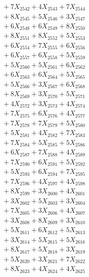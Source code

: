\documentclass[a4paper,10pt]{article}
\begin{document}
{\begin{align}
&\;  + 7 X_{2542} + 4 X_{2543} + 7 X_{2544} \\[0.3ex]
&\;  + 8 X_{2545} + 5 X_{2546} + 3 X_{2547} \\[0.3ex]
&\;  + 6 X_{2548} + 6 X_{2549} + 8 X_{2550} \\[0.3ex]
&\;  + 8 X_{2551} + 8 X_{2552} + 5 X_{2553} \\[0.3ex]
&\;  + 6 X_{2554} + 7 X_{2555} + 6 X_{2556} \\[0.3ex]
&\;  + 6 X_{2557} + 6 X_{2558} + 5 X_{2559} \\[0.5ex]\allowbreak
&\;  + 5 X_{2560} + 5 X_{2561} + 6 X_{2562} \\[0.3ex]
&\;  + 6 X_{2563} + 6 X_{2564} + 5 X_{2565} \\[0.3ex]
&\;  + 5 X_{2566} + 3 X_{2567} + 6 X_{2568} \\[0.3ex]
&\;  + 8 X_{2569} + 3 X_{2570} + 5 X_{2571} \\[0.3ex]
&\;  + 4 X_{2572} + 3 X_{2573} + 4 X_{2574} \\[0.3ex]
&\;  + 7 X_{2575} + 6 X_{2576} + 4 X_{2577} \\[0.3ex]
&\;  + 7 X_{2578} + 7 X_{2579} + 5 X_{2580} \\[0.3ex]
&\;  + 5 X_{2581} + 4 X_{2582} + 7 X_{2583} \\[0.3ex]
&\;  + 7 X_{2584} + 5 X_{2585} + 5 X_{2586} \\[0.3ex]
&\;  + 6 X_{2587} + 7 X_{2588} + 4 X_{2589} \\[0.5ex]\allowbreak
&\;  + 7 X_{2590} + 6 X_{2591} + 5 X_{2592} \\[0.3ex]
&\;  + 5 X_{2593} + 6 X_{2594} + 7 X_{2595} \\[0.3ex]
&\;  + 7 X_{2596} + 4 X_{2597} + 4 X_{2598} \\[0.3ex]
&\;  + 8 X_{2599} + 3 X_{2600} + 4 X_{2601} \\[0.3ex]
&\;  + 3 X_{2602} + 5 X_{2603} + 3 X_{2604} \\[0.3ex]
&\;  + 7 X_{2605} + 3 X_{2606} + 4 X_{2607} \\[0.3ex]
&\;  + 3 X_{2608} + 8 X_{2609} + 3 X_{2610} \\[0.3ex]
&\;  + 5 X_{2611} + 6 X_{2612} + 5 X_{2613} \\[0.3ex]
&\;  + 3 X_{2614} + 5 X_{2615} + 5 X_{2616} \\[0.3ex]
&\;  + 8 X_{2617} + 5 X_{2618} + 3 X_{2619} \\[0.5ex]\allowbreak
&\;  + 5 X_{2620} + 3 X_{2621} + 7 X_{2622} \\[0.3ex]
&\;  + 8 X_{2623} + 4 X_{2624} + 4 X_{2625} \\[0.3ex]

\end{align}}
\end{document}
